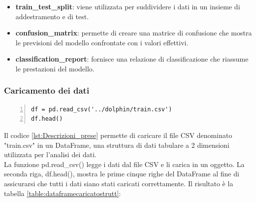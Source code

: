 \documentclass[a4paper,final,12pt]{report}
\begin{document}
\begin{itemize}
    \begin{itemize}
        \item \textbf{train\_test\_split}: viene utilizzata per suddividere i dati in un insieme di addestramento e di test.
        \item \textbf{confusion\_matrix}:  permette di creare una matrice di confusione che mostra le previsioni del modello confrontate con i valori effettivi.
        \item \textbf{classification\_report}: fornisce una relazione di classificazione che riassume le prestazioni del modello.
    \end{itemize}
\end{itemize}

\newpage
\subsubsection{Caricamento dei dati}
\begin{lstlisting}[caption={Caricamento dei dati di training.}, label={lst:Descrizioni_prese}, breaklines, escapechar=`\%, frame=lines, basicstyle=\small\ttfamily, keepspaces=true, numbers=left]
df = pd.read_csv('../dolphin/train.csv')
df.head()
\end{lstlisting}
Il codice \ref{lst:Descrizioni_prese} permette di caricare il file CSV denominato "train.csv" in un DataFrame, una struttura di dati tabulare a 2 dimensioni utilizzata per l'analisi dei dati. \\
La funzione pd.read\_csv() legge i dati dal file CSV e li carica in un oggetto. La seconda riga, df.head(), mostra le prime cinque righe del DataFrame al fine di assicurarsi che tutti i dati siano stati caricati correttamente. Il risultato è la tabella \ref{table:dataframecaricatostrutt}:
\end{document}
